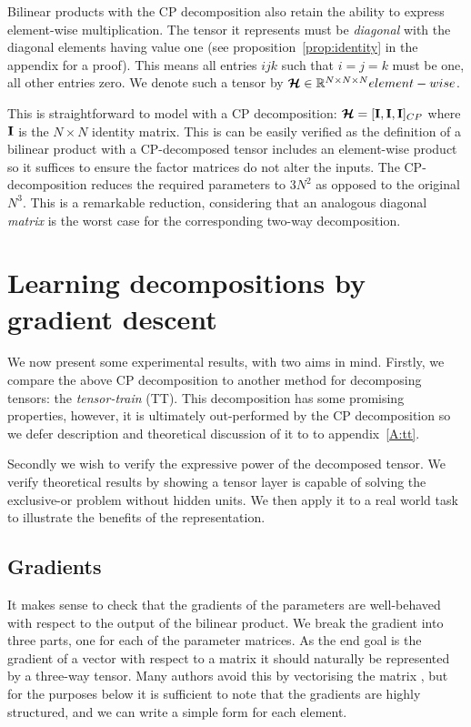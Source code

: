 Bilinear products with the CP decomposition also retain the ability to express element-wise
multiplication. The tensor it represents must be \textit{diagonal} with the
 diagonal elements having value one
 (see proposition~\ref{prop:identity} in the appendix for a proof). This means all entries
\(ijk\) such that \(i = j = k\) must be one, all other entries zero. We denote such a tensor
by \(\bm{\mathcal{H}} \in \mathbb{R}^{N \times N \times N}element-wise\).

This is straightforward to model with a CP decomposition:
\(\bm{\mathcal{H}} = [\mathbf{I}, \mathbf{I}, \mathbf{I}]_{CP}\) where \(\mathbf{I}\) is the 
\(N\times N\) identity matrix. This is can be easily verified as the definition of a bilinear
product with a CP-decomposed tensor includes an element-wise product so it suffices to ensure the
factor matrices do not alter the inputs. The CP-decomposition reduces the required parameters
to \(3N^2\) as opposed to the original \(N^3\). This is a remarkable reduction, considering that
an analogous diagonal \emph{matrix} is the worst case for the corresponding two-way 
decomposition. 



\section{Learning decompositions by gradient descent}
We now present some experimental results, with two aims in mind. Firstly, we compare the above CP
decomposition to another method for decomposing tensors: the \emph{tensor-train} (TT). This decomposition
has some promising properties, however, it is ultimately out-performed by the CP decomposition so we defer
description and theoretical discussion of it to to appendix~\ref{A:tt}.

Secondly we wish to verify the expressive power of the decomposed tensor. We verify theoretical
results by showing a tensor layer is capable of solving the exclusive-or problem without hidden units.
We then apply it to a real world task to illustrate the benefits of the representation.

\subsection{Gradients}
It makes sense to check that the gradients of the parameters are well-behaved
with respect to the output of the bilinear product. We break the gradient into three parts,
one for each of the parameter matrices. As the end goal is the gradient of a vector with respect
to a matrix it should naturally be represented by a three-way tensor. Many authors avoid this by
vectorising the matrix \autocite{Magnus2007}, but for the purposes below it is sufficient to note
that the gradients are highly structured, and we can write a simple form for each element.

